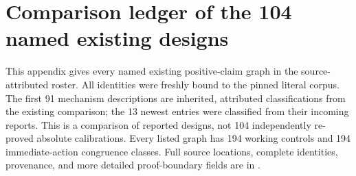 \clearpage\section{Comparison ledger of the 104 named existing designs}
This appendix gives every named existing positive-claim graph in the
source-attributed roster. All identities were freshly bound to the pinned
literal corpus. The first 91 mechanism descriptions are inherited,
attributed classifications from the existing comparison; the 13 newest
entries were classified from their incoming reports. This is a comparison
of reported designs, not 104 independently re-proved absolute calibrations.
Every listed graph has 194 working controls and 194 immediate-action
congruence classes. Full source locations, complete identities, provenance,
and more detailed proof-boundary fields are in
.
\begingroup\footnotesize
